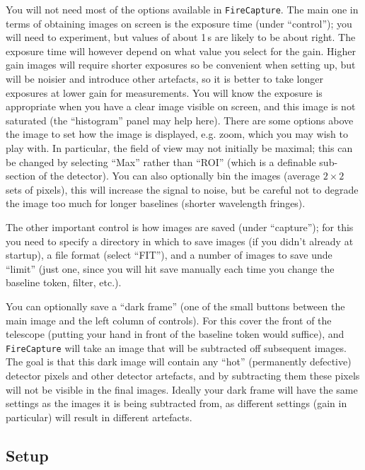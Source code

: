 \documentclass[11pt]{article}
\begin{document}
You will not need most of the options available in \texttt{FireCapture}. The main one in terms of obtaining images on screen is the exposure time (under ``control''); you will need to experiment, but values of about 1\,s are likely to be about right. The exposure time will however depend on what value you select for the gain. Higher gain images will require shorter exposures so be convenient when setting up, but will be noisier and introduce other artefacts, so it is better to take longer exposures at lower gain for measurements. You will know the exposure is appropriate when you have a clear image visible on screen, and this image is not saturated (the ``histogram'' panel may help here). There are some options above the image to set how the image is displayed, e.g. zoom, which you may wish to play with. In particular, the field of view may not initially be maximal; this can be changed by selecting ``Max'' rather than ``ROI'' (which is a definable sub-section of the detector). You can also optionally bin the images (average $2 \times 2$ sets of pixels), this will increase the signal to noise, but be careful not to degrade the image too much for longer baselines (shorter wavelength fringes).

The other important control is how images are saved (under ``capture''); for this you need to specify a directory in which to save images (if you didn't already at startup), a file format (select ``FIT''), and a number of images to save unde ``limit'' (just one, since you will hit save manually each time you change the baseline token, filter, etc.).

You can optionally save a ``dark frame'' (one of the small buttons between the main image and the left column of controls). For this cover the front of the telescope (putting your hand in front of the baseline token would suffice), and \texttt{FireCapture} will take an image that will be subtracted off subsequent images. The goal is that this dark image will contain any ``hot'' (permanently defective) detector pixels and other detector artefacts, and by subtracting them these pixels will not be visible in the final images. Ideally your dark frame will have the same settings as the images it is being subtracted from, as different settings (gain in particular) will result in different artefacts.

\subsection{Setup}
\end{document}
